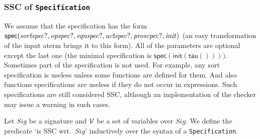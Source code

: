 \documentclass[fleqn,a4paper]{article}
\newcommand{\aterm}[1]{\mathsf{#1}}
\newcommand{\NV}{{\cal V}}
\begin{document}
\subsubsection{SSC of \texttt{Specification}}
We assume that the specification has the form
$\aterm{spec}(\nm{sortspec?},\nm{opspec?},\nm{eqnspec?},\nm{actspec?},\nm{proscpec?},\nm{init})$
(an easy transformation of the input aterm brings it to this form).
All of the parameters are optional except the last one (the minimal specification is
$\aterm{spec}(\aterm{init}(\aterm{tau}())))$.
Sometimes part of the specification is not used. For example, any sort specification is useless
unless some functions are defined for them. And also functions specifications are useless if they do not
occur in expressions. Such specifications are still considered SSC, although an implementation of the checker
may issue a warning in such cases.

Let $Sig$ be a signature and $\NV$ be a set of variables over $Sig$. We
define the predicate `is SSC wrt.\ $Sig$'
inductively over the syntax of a {\tt Specification}.
\end{document}
